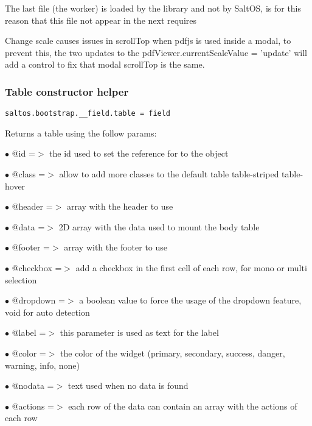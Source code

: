 \documentclass[a4paper]{article}
\begin{document}
The last file (the worker) is loaded by the library and not by SaltOS, is for this reason
that this file not appear in the next requires

Change scale causes issues in scrollTop when pdfjs is used inside a modal, to prevent this,
the two updates to the pdfViewer.currentScaleValue = 'update' will add a control to fix
that modal scrollTop is the same.

\hypertarget{toc633}{}
\subsubsection{Table constructor helper}

\begin{lstlisting}
saltos.bootstrap.__field.table = field
\end{lstlisting}

Returns a table using the follow params:

\begin{compactitem}
\item[\color{myblue}$\bullet$] @id       =$>$ the id used to set the reference for to the object
\item[\color{myblue}$\bullet$] @class    =$>$ allow to add more classes to the default table table-striped table-hover
\item[\color{myblue}$\bullet$] @header   =$>$ array with the header to use
\item[\color{myblue}$\bullet$] @data     =$>$ 2D array with the data used to mount the body table
\item[\color{myblue}$\bullet$] @footer   =$>$ array with the footer to use
\item[\color{myblue}$\bullet$] @checkbox =$>$ add a checkbox in the first cell of each row, for mono or multi selection
\item[\color{myblue}$\bullet$] @dropdown =$>$ a boolean value to force the usage of the dropdown feature, void for auto detection
\item[\color{myblue}$\bullet$] @label    =$>$ this parameter is used as text for the label
\item[\color{myblue}$\bullet$] @color    =$>$ the color of the widget (primary, secondary, success, danger, warning, info, none)
\item[\color{myblue}$\bullet$] @nodata   =$>$ text used when no data is found
\item[\color{myblue}$\bullet$] @actions  =$>$ each row of the data can contain an array with the actions of each row
\end{compactitem}
\end{document}
